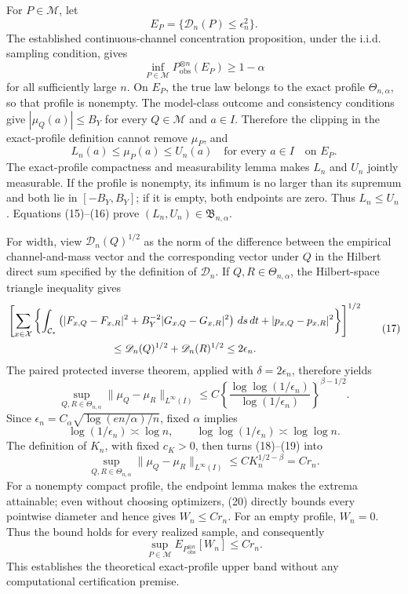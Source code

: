 For \(P\in\mathcal M\), let
\[
E_P=\{\mathscr D_n(P)\le\epsilon_n^2\}.
\]
The established continuous-channel concentration proposition, under the i.i.d. sampling condition, gives
\[
\inf_{P\in\mathcal M}P_{\mathrm{obs}}^{\otimes n}(E_P)\ge1-\alpha \tag{15}
\]
for all sufficiently large \(n\).  On \(E_P\), the true law belongs to the exact profile \(\Theta_{n,\alpha}\), so that profile is nonempty.  The model-class outcome and consistency conditions give \(|\mu_Q(a)|\le B_Y\) for every \(Q\in\mathcal M\) and \(a\in I\).  Therefore the clipping in the exact-profile definition cannot remove \(\mu_P\), and
\[
L_n(a)\le\mu_P(a)\le U_n(a)
\quad\text{for every }a\in I \quad\text{on }E_P. \tag{16}
\]
The exact-profile compactness and measurability lemma makes \(L_n\) and \(U_n\) jointly measurable.  If the profile is nonempty, its infimum is no larger than its supremum and both lie in \([-B_Y,B_Y]\); if it is empty, both endpoints are zero.  Thus \(L_n\le U_n\).  Equations (15)--(16) prove \((L_n,U_n)\in\mathfrak B_{n,\alpha}\).

For width, view \(\mathscr D_n(Q)^{1/2}\) as the norm of the difference between the empirical channel-and-mass vector and the corresponding vector under \(Q\) in the Hilbert direct sum specified by the definition of \(\mathscr D_n\).  If \(Q,R\in\Theta_{n,\alpha}\), the Hilbert-space triangle inequality gives
\[
\begin{aligned}
&\left[\sum_{x\in\mathcal X}\left\{
\int_{\mathcal C_*}\left(|F_{x,Q}-F_{x,R}|^2
+B_Y^{-2}|G_{x,Q}-G_{x,R}|^2\right)\,ds\,dt
+|p_{x,Q}-p_{x,R}|^2\right\}\right]^{1/2}\\
&\hspace{35mm}\le \mathscr D_n(Q)^{1/2}+\mathscr D_n(R)^{1/2}
\le2\epsilon_n. 
\end{aligned} \tag{17}
\]
The paired protected inverse theorem, applied with \(\delta=2\epsilon_n\), therefore yields
\[
\sup_{Q,R\in\Theta_{n,\alpha}}
\|\mu_Q-\mu_R\|_{L^\infty(I)}
\le C\left\{\frac{\log\log(1/\epsilon_n)}{\log(1/\epsilon_n)}\right\}^{\beta-1/2}. \tag{18}
\]
Since \(\epsilon_n=C_\alpha\sqrt{\log(en/\alpha)/n}\), fixed \(\alpha\) implies
\[
\log(1/\epsilon_n)\asymp\log n,
\qquad
\log\log(1/\epsilon_n)\asymp\log\log n. \tag{19}
\]
The definition of \(K_n\), with fixed \(c_K>0\), then turns (18)--(19) into
\[
\sup_{Q,R\in\Theta_{n,\alpha}}
\|\mu_Q-\mu_R\|_{L^\infty(I)}\le C K_n^{1/2-\beta}=Cr_n. \tag{20}
\]
For a nonempty compact profile, the endpoint lemma makes the extrema attainable; even without choosing optimizers, (20) directly bounds every pointwise diameter and hence gives \(W_n\le Cr_n\).  For an empty profile, \(W_n=0\).  Thus the bound holds for every realized sample, and consequently
\[
\sup_{P\in\mathcal M}E_{P_{\mathrm{obs}}^{\otimes n}}[W_n]\le Cr_n.
\]
This establishes the theoretical exact-profile upper band without any computational certification premise.

